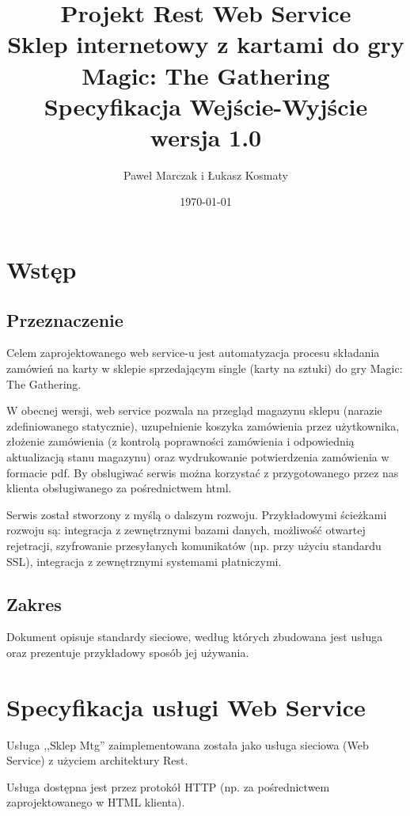 \documentclass[11pt]{article}   %
\begin{document}
	\begin{titlepage}
	\title{%
		Projekt Rest Web Service\\
		\large Sklep internetowy z kartami do gry Magic: The Gathering\\
		Specyfikacja Wejście-Wyjście\\
	wersja 1.0}
	\author{Paweł Marczak i Łukasz Kosmaty}         %
	\date{\today}    %
	\maketitle
	\end{titlepage}
	\tableofcontents
	\section{Wstęp}     %
	\subsection{Przeznaczenie}
	Celem zaprojektowanego web service-u jest automatyzacja procesu składania zamówień na karty w sklepie sprzedającym single (karty na sztuki) do gry Magic: The Gathering.\par W obecnej wersji, web service pozwala na przegląd magazynu sklepu (narazie zdefiniowanego statycznie),  uzupełnienie koszyka zamówienia przez użytkownika, złożenie zamówienia (z kontrolą poprawności zamówienia i odpowiednią aktualizacją stanu magazynu) oraz wydrukowanie potwierdzenia zamówienia w formacie pdf. By obslugiwać serwis można korzystać z przygotowanego przez nas klienta obsługiwanego za pośrednictwem html.\par Serwis został stworzony z myślą o dalszym rozwoju. Przykładowymi ścieżkami rozwoju są: integracja z zewnętrznymi bazami danych, możliwość otwartej rejetracji, szyfrowanie przesyłanych komunikatów (np. przy użyciu standardu SSL), integracja z zewnętrznymi systemami płatniczymi.
	\subsection{Zakres}
Dokument opisuje standardy sieciowe, według których zbudowana jest usługa oraz
prezentuje przykładowy sposób jej używania.
\section{Specyfikacja usługi Web Service}
Usługa ,,Sklep Mtg'' zaimplementowana została jako usługa sieciowa (Web
Service) z użyciem architektury Rest. \par
Usługa dostępna jest przez protokół HTTP (np. za pośrednictwem zaprojektowanego w HTML klienta).
\end{document}
